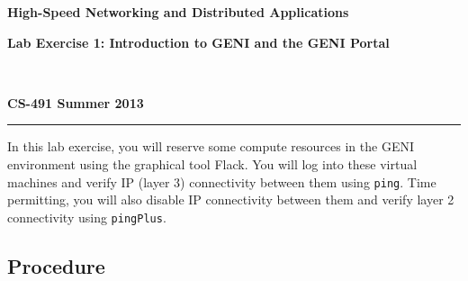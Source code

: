 \documentclass[12pt,letterpaper]{article}
\begin{document}
\raggedright
\centerline{\textbf{High-Speed Networking and Distributed Applications}}
\centerline{\textbf{Lab Exercise 1: Introduction to GENI and the GENI Portal}}
~\\
\centerline{\textbf{CS-491 \hfill Summer 2013}}
\noindent\rule{\textwidth}{1pt}

\bigskip
In this lab exercise, you will reserve some compute resources in the GENI 
environment using the graphical tool Flack. You will log into these virtual
machines and verify IP (layer 3) connectivity between them using 
\texttt{ping}. Time permitting, you will also disable IP connectivity between 
them and verify layer 2 connectivity using \texttt{pingPlus}.

\subsection*{Procedure}
\end{document}
